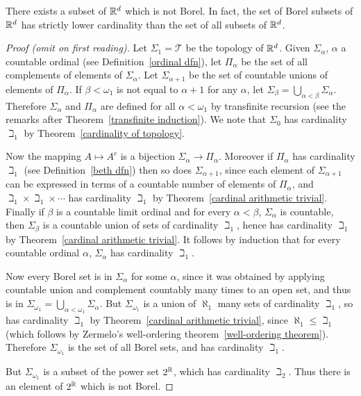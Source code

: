 \begin{lemma}
\label{Borel sigma algebra}
There exists a subset of $\mathbb{R}^d$ which is not Borel.
In fact, the set of Borel subsets of $\mathbb{R}^d$ has strictly lower cardinality than the set of all subsets of $\mathbb{R}^d$.
\end{lemma}
\begin{proof}[Proof (omit on first reading)]
Let $\Sigma_1 = \mathcal T$ be the topology of $\mathbb{R}^d$.
Given $\Sigma_\alpha$, $\alpha$ a countable ordinal (see Definition~\ref{ordinal dfn}), let $\Pi_\alpha$ be the set of all complements of elements of $\Sigma_\alpha$.
Let $\Sigma_{\alpha+1}$ be the set of countable unions of elements of $\Pi_\alpha$.
If $\beta < \omega_1$ is not equal to $\alpha+1$ for any $\alpha$, let $\Sigma_{\beta} = \bigcup_{\alpha < \beta} \Sigma_\alpha$.
Therefore $\Sigma_\alpha$ and $\Pi_\alpha$ are defined for all $\alpha < \omega_1$ by transfinite recursion (see the remarks after Theorem~\ref{transfinite induction}).
We note that $\Sigma_0$ has cardinality $\beth_1$ by Theorem~\ref{cardinality of topology}.

Now the mapping $A \mapsto A^c$ is a bijection $\Sigma_{\alpha} \to \Pi_\alpha$.
Moreover if $\Pi_\alpha$ has cardinality $\beth_1$ (see Definition~\ref{beth dfn}) then so does $\Sigma_{\alpha+1}$, since each element of $\Sigma_{\alpha+1}$ can be expressed in terms of a countable number of elements of $\Pi_\alpha$, and $\beth_1 \times \beth_1 \times \cdots$ has cardinality $\beth_1$ by Theorem~\ref{cardinal arithmetic trivial}.
Finally if $\beta$ is a countable limit ordinal and for every $\alpha < \beta$, $\Sigma_\alpha$ is countable, then $\Sigma_\beta$ is a countable union of sets of cardinality $\beth_1$, hence has cardinality $\beth_1$ by Theorem~\ref{cardinal arithmetic trivial}.
It follows by induction that for every countable ordinal $\alpha$, $\Sigma_\alpha$ has cardinality $\beth_1$.

Now every Borel set is in $\Sigma_\alpha$ for some $\alpha$, since it was obtained by applying countable union and complement countably many times to an open set, and thus is in $\Sigma_{\omega_1} = \bigcup_{\alpha < \omega_1} \Sigma_\alpha$.
But $\Sigma_{\omega_1}$ is a union of $\aleph_1$ many sets of cardinality $\beth_1$, so has cardinality $\beth_1$ by Theorem~\ref{cardinal arithmetic trivial},
since $\aleph_1 \leq \beth_1$ (which follows by Zermelo's well-ordering theorem~\ref{well-ordering theorem}).
Therefore $\Sigma_{\omega_1}$ is the set of all Borel sets, and has cardinality $\beth_1$.

But $\Sigma_{\omega_1}$ is a subset of the power set $2^{\mathbb{R}}$, which has cardinality $\beth_2$. Thus there is an element of $2^{\mathbb{R}}$ which is not Borel.
\end{proof}

